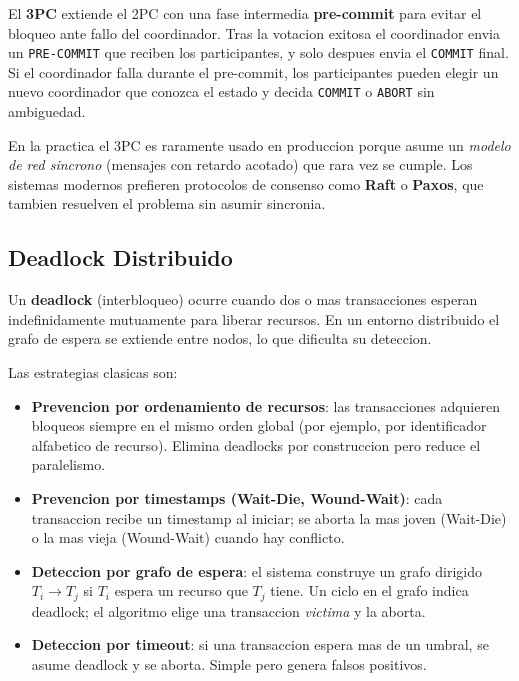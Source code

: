\documentclass[11pt,a4paper]{article}
\begin{document}
El \textbf{3PC} extiende el 2PC con una fase intermedia \textbf{pre-commit} para evitar el bloqueo ante fallo del coordinador. Tras la votacion exitosa el coordinador envia un \texttt{PRE-COMMIT} que reciben los participantes, y solo despues envia el \texttt{COMMIT} final. Si el coordinador falla durante el pre-commit, los participantes pueden elegir un nuevo coordinador que conozca el estado y decida \texttt{COMMIT} o \texttt{ABORT} sin ambiguedad.

En la practica el 3PC es raramente usado en produccion porque asume un \textit{modelo de red sincrono} (mensajes con retardo acotado) que rara vez se cumple. Los sistemas modernos prefieren protocolos de consenso como \textbf{Raft} \cite{ongaro2014} o \textbf{Paxos}, que tambien resuelven el problema sin asumir sincronia.

\subsection{Deadlock Distribuido}

Un \textbf{deadlock} (interbloqueo) ocurre cuando dos o mas transacciones esperan indefinidamente mutuamente para liberar recursos. En un entorno distribuido el grafo de espera se extiende entre nodos, lo que dificulta su deteccion.

Las estrategias clasicas son:

\begin{itemize}[leftmargin=*]
\item \textbf{Prevencion por ordenamiento de recursos}: las transacciones adquieren bloqueos siempre en el mismo orden global (por ejemplo, por identificador alfabetico de recurso). Elimina deadlocks por construccion pero reduce el paralelismo.
\item \textbf{Prevencion por timestamps (Wait-Die, Wound-Wait)}: cada transaccion recibe un timestamp al iniciar; se aborta la mas joven (Wait-Die) o la mas vieja (Wound-Wait) cuando hay conflicto.
\item \textbf{Deteccion por grafo de espera}: el sistema construye un grafo dirigido $T_i \rightarrow T_j$ si $T_i$ espera un recurso que $T_j$ tiene. Un ciclo en el grafo indica deadlock; el algoritmo elige una transaccion \textit{victima} y la aborta.
\item \textbf{Deteccion por timeout}: si una transaccion espera mas de un umbral, se asume deadlock y se aborta. Simple pero genera falsos positivos.
\end{itemize}
\end{document}
